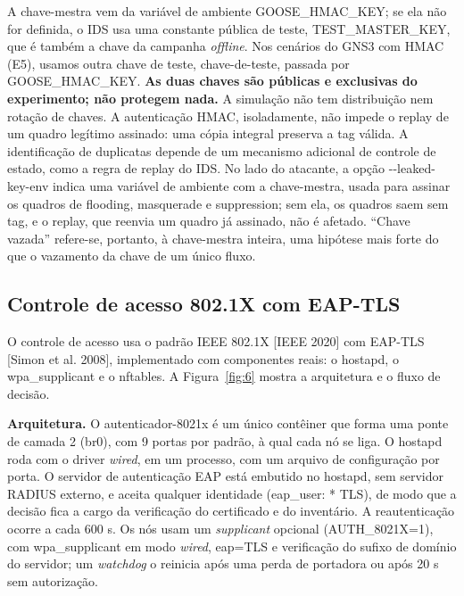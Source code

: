 \documentclass[12pt]{article}
\newcommand{\cit}[2]{[#1]\nocite{#2}}
\begin{document}
A chave-mestra vem da variável de ambiente GOOSE\_\allowbreak{}HMAC\_\allowbreak{}KEY; se ela não for definida, o IDS usa uma constante pública de teste, TEST\_\allowbreak{}MASTER\_\allowbreak{}KEY, que é também a chave da campanha \emph{offline}. Nos cenários do GNS3 com HMAC (E5), usamos outra chave de teste, chave-de-teste, passada por GOOSE\_\allowbreak{}HMAC\_\allowbreak{}KEY. \textbf{As duas chaves são públicas e exclusivas do experimento; não protegem nada.} A simulação não tem distribuição nem rotação de chaves. A autenticação HMAC, isoladamente, não impede o replay de um quadro legítimo assinado: uma cópia integral preserva a tag válida. A identificação de duplicatas depende de um mecanismo adicional de controle de estado, como a regra de replay do IDS. No lado do atacante, a opção -{}-leaked-key-env indica uma variável de ambiente com a chave-mestra, usada para assinar os quadros de flooding, masquerade e suppression; sem ela, os quadros saem sem tag, e o replay, que reenvia um quadro já assinado, não é afetado. \textquotedblleft{}Chave vazada\textquotedblright{} refere-se, portanto, à chave-mestra inteira, uma hipótese mais forte do que o vazamento da chave de um único fluxo.

\subsection{Controle de acesso 802.1X com EAP-TLS}\label{sec:5.3}

O controle de acesso usa o padrão IEEE 802.1X \cit{IEEE 2020}{ieee8021x} com EAP-TLS \cit{Simon et al. 2008}{rfc5216}, implementado com componentes reais: o hostapd, o wpa\_\allowbreak{}supplicant e o nftables. A Figura~\ref{fig:6} mostra a arquitetura e o fluxo de decisão.

\textbf{Arquitetura.} O autenticador-8021x é um único contêiner que forma uma ponte de camada 2 (br0), com 9 portas por padrão, à qual cada nó se liga. O hostapd roda com o driver \emph{wired}, em um processo, com um arquivo de configuração por porta. O servidor de autenticação EAP está embutido no hostapd, sem servidor RADIUS externo, e aceita qualquer identidade (eap\_\allowbreak{}user: * TLS), de modo que a decisão fica a cargo da verificação do certificado e do inventário. A reautenticação ocorre a cada 600 s. Os nós usam um \emph{supplicant} opcional (AUTH\_\allowbreak{}8021X=1), com wpa\_\allowbreak{}supplicant em modo \emph{wired}, eap=TLS e verificação do sufixo de domínio do servidor; um \emph{watchdog} o reinicia após uma perda de portadora ou após 20 s sem autorização.
\end{document}
